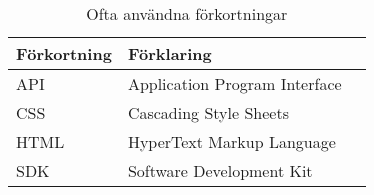 \documentclass[a4paper,12pt,oneside,final]{extbook}
\begin{document}
\begin{table}[h]
  \begin{centering}
    \begin{tabular}{|l|l|l|}
    \hline
    \textbf{Förkortning} & \textbf{Förklaring} \\
    \hline
    API & Application Program Interface \\
    \hline
    CSS & Cascading Style Sheets \\
    \hline
    HTML & HyperText Markup Language \\
    \hline
    SDK & Software Development Kit \\
    \hline
    \end{tabular}
    \caption[Table caption text]{Ofta användna förkortningar}
    \label{table:abbr}
  \end{centering}
\end{table}

\mainmatter








\end{document}
